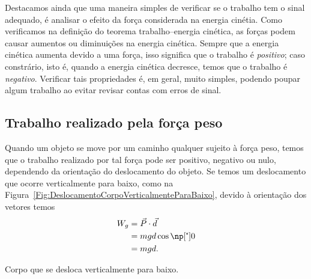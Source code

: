 Destacamos ainda que uma maneira simples de verificar se o trabalho tem o sinal adequado, é analisar o efeito da força considerada na energia cinétia. Como verificamos na definição do teorema trabalho--energia cinética, as forças podem causar aumentos ou diminuições na energia cinética. Sempre que a energia cinética aumenta devido a uma força, isso significa que o trabalho é \emph{positivo}; caso constrário, isto é, quando a energia cinética decresce, temos que o trabalho é \emph{negativo}. Verificar tais propriedades é, em geral, muito simples, podendo poupar algum trabalho ao evitar revisar contas com erros de sinal.

\subsection{Trabalho realizado pela força peso}

Quando um objeto se move por um caminho qualquer sujeito à força peso, temos que o trabalho realizado por tal força pode ser positivo, negativo ou nulo, dependendo da orientação do deslocamento do objeto. Se temos um deslocamento que ocorre verticalmente para baixo, como na Figura~\ref{Fig:DeslocamentoCorpoVerticalmenteParaBaixo}, devido à orientação dos vetores temos
\begin{align}
  W_g &= \vec{P}\cdot\vec{d} \\
  &= mgd\cos\degree{0} \\
  &= mgd.
\end{align}
\begin{marginfigure}[-10cm]
\centering
{}
\caption{Corpo que se desloca verticalmente para baixo. \label{Fig:DeslocamentoCorpoVerticalmenteParaBaixo}}
\end{marginfigure}


